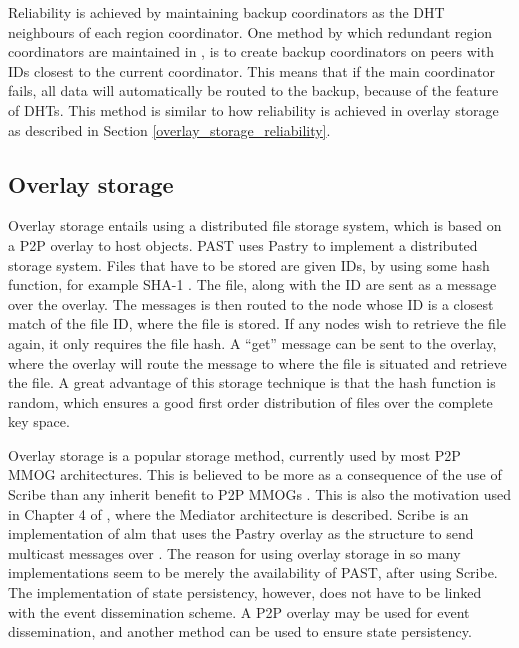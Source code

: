 \documentclass[10pt,a4paper,journal,cspaper,compsoc]{IEEEtran}
\begin{document}
Reliability is achieved by maintaining backup coordinators as the \ac{DHT} neighbours of each region coordinator. One method by which redundant
region coordinators are maintained in \cite{knutsson_p2p_first}, is to create backup coordinators on peers with IDs closest to the current
coordinator. This means that if the main coordinator fails, all data will automatically be routed to the backup, because of the feature of \acp{DHT}.
This method is similar to how reliability is achieved in overlay storage as described in Section \ref{overlay_storage_reliability}.

\subsection{Overlay storage}
\label{overlay_storage}

Overlay storage entails using a distributed file storage system, which is based on a P2P overlay to host objects. PAST \cite{PAST_storage} uses
Pastry to implement a distributed storage system. Files that have to be stored are given IDs, by using some hash function, for example SHA-1
\cite{SHA}. The file, along with the ID are sent as a message over the overlay. The messages is then routed to the node whose ID is a closest match
of the file ID, where the file is stored. If any nodes wish to retrieve the file again, it only requires the file hash. A ``get'' message can be sent
to the overlay, where the overlay will route the message to where the file is situated and retrieve the file. A great advantage of this storage
technique is that the hash function is random, which ensures a good first order distribution of files over the complete key space.


Overlay storage is a popular storage method, currently used by most P2P MMOG architectures. This is believed to be more as a consequence of the use
of Scribe than any inherit benefit to P2P MMOGs \cite{past_storage_focus}. This is also the motivation used in Chapter 4 of \cite{Fan_phd}, where the
Mediator architecture is described. Scribe is an implementation of \ac{alm} that uses the Pastry overlay as the structure to send multicast messages
over \cite{scribe}. The reason for using overlay storage in so many implementations seem to be merely the availability of PAST, after using Scribe.
The implementation of state persistency, however, does not have to be linked with the event dissemination scheme. A P2P overlay may be used for event
dissemination, and another method can be used to ensure state persistency.
\end{document}
